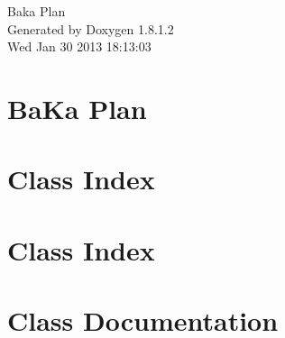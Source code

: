 \documentclass{book}
\begin{document}
\hypersetup{pageanchor=false,citecolor=blue}
\begin{titlepage}
\vspace*{7cm}
\begin{center}
{\Large Baka Plan }\\
\vspace*{1cm}
{\large Generated by Doxygen 1.8.1.2}\\
\vspace*{0.5cm}
{\small Wed Jan 30 2013 18:13:03}\\
\end{center}
\end{titlepage}
\clearemptydoublepage
{}
\tableofcontents
\clearemptydoublepage
{}
\hypersetup{pageanchor=true,citecolor=blue}
\chapter{Ba\-Ka Plan}
\label{md_README}
\hypertarget{md_README}{}

\chapter{Class Index}

\chapter{Class Index}

\chapter{Class Documentation}














\printindex
\end{document}
